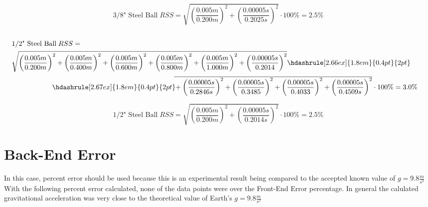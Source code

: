 \begin{equation*}
  \text{3/8" Steel Ball} \; RSS = \sqrt{\left( \frac{0.005m}{0.200m} \right)^2 + \left( \frac{0.00005s}{0.2025s} \right)^2} \cdot 100\% = 2.5\%
\end{equation*}


\begin{fleqn}
\begin{equation*}
  \begin{split}
  \\[-1ex]
      & \text{1/2" Steel Ball} \; RSS = \\
      &\begin{multlined}[0.9\linewidth]
      \sqrt{\left( \frac{0.005m}{0.200m} \right)^2 + \left( \frac{0.005m}{0.400m} \right)^2 + \left( \frac{0.005m}{0.600m} \right)^2 + \left( \frac{0.005m}{0.800m} \right)^2 + \left( \frac{0.005m}{1.000m} \right)^2 + \left( \frac{0.00005s}{0.2014} \right)^2 }\hdashrule[2.66ex]{1.8em}{0.4pt}{2pt} \\[0.5ex]
       {\hdashrule[2.67ex]{1.8em}{0.4pt}{2pt}}\mkern -4mu\overline{\rule{0pt}{2.4ex} + \left( \frac{0.00005s}{0.2846s} \right)^2 + \left( \frac{0.00005s}{0.3485} \right)^2 + \left( \frac{0.00005s}{0.4033} \right)^2 + \left( \frac{0.00005s}{0.4509s} \right)^2} \cdot 100\% = 3.0\%
      \end{multlined}
  \end{split}
\end{equation*}
\end{fleqn}

\begin{equation*}
  \text{1/2" Steel Ball} \; RSS = \sqrt{\left( \frac{0.005m}{0.200m} \right)^2 + \left( \frac{0.00005s}{0.2014s} \right)^2} \cdot 100\% = 2.5\%
\end{equation*}

\section{Back-End Error}

In this case, percent error should be used because this is an experimental
result being compared to the accepted known value of $g = 9.8\frac{m}{s^2}$
With the following percent error calculated, none of the data points were over 
the Front-End Error percentage. In general the calulated gravitational acceleration
was very close to the theoretical value of Earth's $g = 9.8\frac{m}{s^2}$ 


